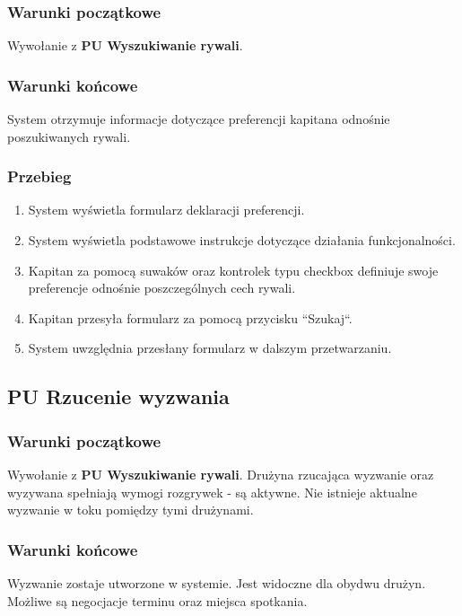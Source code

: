 \subsubsection{Warunki początkowe}

Wywołanie z \textbf{PU Wyszukiwanie rywali}.

\subsubsection{Warunki końcowe}

System otrzymuje informacje dotyczące preferencji kapitana odnośnie poszukiwanych rywali.

\subsubsection{Przebieg}
\begin{enumerate}
  \item System wyświetla formularz deklaracji preferencji.
  \item System wyświetla podstawowe instrukcje dotyczące działania funkcjonalności.
  \item Kapitan za pomocą suwaków oraz kontrolek typu checkbox definiuje swoje preferencje odnośnie poszczególnych cech rywali.
  \item Kapitan przesyła formularz za pomocą przycisku ``Szukaj``.
  \item System uwzględnia przesłany formularz w dalszym przetwarzaniu. 
\end{enumerate}


\subsection{PU Rzucenie wyzwania}

\subsubsection{Warunki początkowe}

Wywołanie z \textbf{PU Wyszukiwanie rywali}. Drużyna rzucająca wyzwanie oraz wyzywana spełniają wymogi rozgrywek - są aktywne. Nie istnieje aktualne wyzwanie w toku pomiędzy tymi drużynami.

\subsubsection{Warunki końcowe}

Wyzwanie zostaje utworzone w systemie. Jest widoczne dla obydwu drużyn. Możliwe są negocjacje terminu oraz miejsca spotkania.

